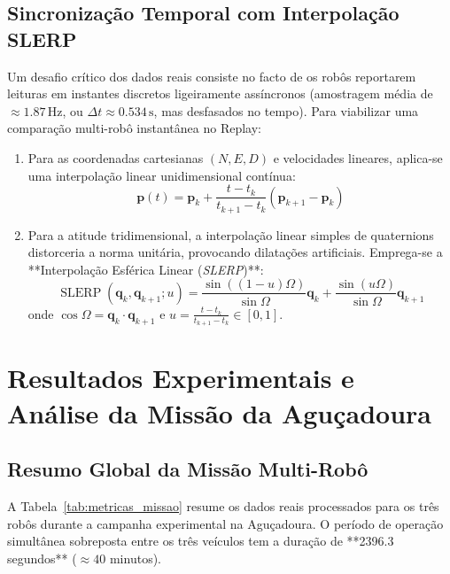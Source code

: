 \documentclass[11pt,a4paper]{article}
\begin{document}
\subsection{Sincronização Temporal com Interpolação SLERP}
Um desafio crítico dos dados reais consiste no facto de os robôs reportarem leituras em instantes discretos ligeiramente assíncronos (amostragem média de $\approx 1.87\,\text{Hz}$, ou $\Delta t \approx 0.534\,\text{s}$, mas desfasados no tempo).
Para viabilizar uma comparação multi-robô instantânea no Replay:
\begin{enumerate}
    \item Para as coordenadas cartesianas $(N, E, D)$ e velocidades lineares, aplica-se uma interpolação linear unidimensional contínua:
    \begin{equation}
        \mathbf{p}(t) = \mathbf{p}_k + \frac{t - t_k}{t_{k+1} - t_k} (\mathbf{p}_{k+1} - \mathbf{p}_k)
    \end{equation}
    \item Para a atitude tridimensional, a interpolação linear simples de quaternions distorceria a norma unitária, provocando dilatações artificiais. Emprega-se a **Interpolação Esférica Linear (\textit{SLERP})**:
    \begin{equation}
        \operatorname{SLERP}(\mathbf{q}_k, \mathbf{q}_{k+1}; u) = \frac{\sin((1 - u)\Omega)}{\sin\Omega} \mathbf{q}_k + \frac{\sin(u\Omega)}{\sin\Omega} \mathbf{q}_{k+1}
    \end{equation}
    onde $\cos\Omega = \mathbf{q}_k \cdot \mathbf{q}_{k+1}$ e $u = \frac{t - t_k}{t_{k+1} - t_k} \in [0, 1]$.
\end{enumerate}

\section{Resultados Experimentais e Análise da Missão da Aguçadoura}

\subsection{Resumo Global da Missão Multi-Robô}
A Tabela~\ref{tab:metricas_missao} resume os dados reais processados para os três robôs durante a campanha experimental na Aguçadoura. O período de operação simultânea sobreposta entre os três veículos tem a duração de **2396.3 segundos** ($\approx 40$ minutos).
\end{document}
